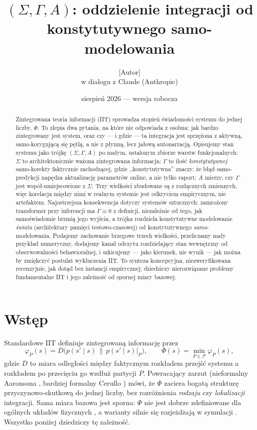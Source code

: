 \documentclass[11pt]{article}
\title{\textbf{$(\Sigma,\Gamma,A)$: oddzielenie integracji od\\ konstytutywnego samo-modelowania}}
\author{[Autor]\\ \small w dialogu z Claude (Anthropic)}
\date{sierpień 2026 --- wersja robocza}
\begin{document}
\maketitle

\begin{abstract}
Zintegrowana teoria informacji (IIT) sprowadza stopień świadomości systemu do jednej liczby, $\Phi$. To zlepia dwa pytania, na które nie odpowiada z osobna: jak bardzo zintegrowany jest system, oraz czy --- i gdzie --- ta integracja jest sprzężona z aktywną, samo-korygującą się pętlą, a nie z płynną, lecz jałową autonarracją. Opisujemy stan systemu jako trójkę $(\Sigma,\Gamma,A)$ po małym, ustalonym zbiorze warstw funkcjonalnych: $\Sigma$ to architektonicznie ważona zintegrowana informacja; $\Gamma$ to ilość \emph{konstytutywnej} samo-korekty faktycznie zachodzącej, gdzie ,,konstytutywna'' znaczy, że błąd samo-predykcji napędza aktualizację parametrów online, a nie tylko raport; $A$ mierzy, czy $\Gamma$ jest współ-umiejscowione z $\Sigma$. Trzy wielkości zbudowane są z rozłącznych zmiennych, więc korelacja między nimi w realnym systemie jest odkryciem empirycznym, nie artefaktem. Najostrzejsza konsekwencja dotyczy systemów sztucznych: zamrożony transformer przy inferencji ma $\Gamma\equiv0$ z definicji, niezależnie od tego, jak samoświadomie brzmią jego wyjścia, a trójka rozdziela konstytutywne modelowanie \emph{świata} (architektury pamięci testowo-czasowej) od konstytutywnego \emph{samo}-modelowania. Podajemy zachowanie brzegowe trzech wielkości, przeliczamy mały przykład numeryczny, dodajemy kanał odczytu rozdzielający stan wewnętrzny od obserwowalności behawioralnej, i szkicujemy --- jako kierunek, nie wynik --- jak można by zmiękczyć postulat wykluczenia IIT. To synteza koncepcyjna, niezweryfikowana recenzyjnie, jak dotąd bez instancji empirycznej; dziedziczy nierozwiązane problemy fundamentalne IIT i jego zależność od spornej miary bazowej.
\end{abstract}

\section{Wstęp}

Standardowe IIT definiuje zintegrowaną informację przez
\[
\varphi_P(s) = D\big(p(s'\mid s)\,\|\,p(s'\mid s)|_P\big), \qquad \Phi(s) = \min_{P\in\mathcal P}\varphi_P(s),
\]
gdzie $D$ to miara odległości między faktycznym rozkładem przejść systemu a rozkładem po przecięciu go wzdłuż partycji $P$. Powracający zarzut (nieformalny Aaronsona \cite{aaronson2014}, bardziej formalny Cerullo \cite{cerullo2015}) mówi, że $\Phi$ zaciera bogatą strukturę przyczynowo-skutkową do jednej liczby, bez rozróżnienia \emph{rodzaju} czy \emph{lokalizacji} integracji. Sama miara bazowa jest sporna: $\Phi$ nie jest dobrze zdefiniowane dla ogólnych układów fizycznych \cite{barrett2019}, a warianty silnie się rozjeżdżają w symulacji \cite{mediano2019}. Wszystko poniżej dziedziczy tę zależność.
\end{document}
